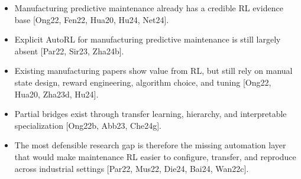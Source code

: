 \begin{itemize}
\item Manufacturing predictive maintenance already has a credible RL evidence base [Ong22, Fen22, Hua20, Hu24, Net24].
\item Explicit AutoRL for manufacturing predictive maintenance is still largely absent [Par22, Sir23, Zha24b].
\item Existing manufacturing papers show value from RL, but still rely on manual state design, reward engineering, algorithm choice, and tuning [Ong22, Hua20, Zha23d, Hu24].
\item Partial bridges exist through transfer learning, hierarchy, and interpretable specialization [Ong22b, Abb23, Che24g].
\item The most defensible research gap is therefore the missing automation layer that would make maintenance RL easier to configure, transfer, and reproduce across industrial settings [Par22, Mus22, Die24, Bai24, Wan22c].
\end{itemize}